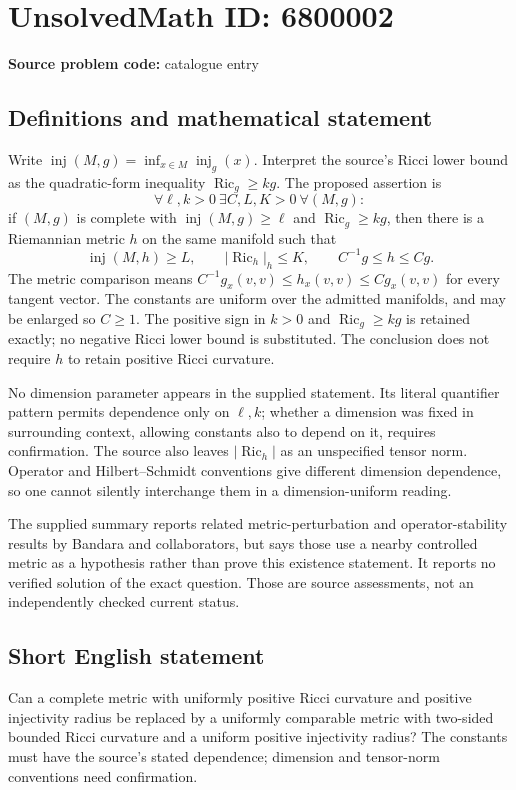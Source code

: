 \documentclass[11pt]{article}
\begin{document}
\section*{UnsolvedMath ID: 6800002}
\textbf{Source problem code:} catalogue entry
\subsection{Definitions and mathematical statement}
Write \(\operatorname{inj}(M,g)=\inf_{x\in M}\operatorname{inj}_g(x)\). Interpret the source's Ricci lower bound as the quadratic-form inequality \(\operatorname{Ric}_g\ge k g\). The proposed assertion is
\[
 \forall\ell,k>0\ \exists C,L,K>0\ \forall(M,g):
\]
if \((M,g)\) is complete with \(\operatorname{inj}(M,g)\ge\ell\) and \(\operatorname{Ric}_g\ge k g\), then there is a Riemannian metric \(h\) on the same manifold such that
\[
 \operatorname{inj}(M,h)\ge L,\qquad |\operatorname{Ric}_h|_h\le K,
 \qquad C^{-1}g\le h\le Cg.
\]
The metric comparison means \(C^{-1}g_x(v,v)\le h_x(v,v)\le Cg_x(v,v)\) for every tangent vector. The constants are uniform over the admitted manifolds, and may be enlarged so \(C\ge1\). The positive sign in \(k>0\) and \(\operatorname{Ric}_g\ge k g\) is retained exactly; no negative Ricci lower bound is substituted. The conclusion does not require \(h\) to retain positive Ricci curvature.

No dimension parameter appears in the supplied statement. Its literal quantifier pattern permits dependence only on \(\ell,k\); whether a dimension was fixed in surrounding context, allowing constants also to depend on it, requires confirmation. The source also leaves \(|\operatorname{Ric}_h|\) as an unspecified tensor norm. Operator and Hilbert--Schmidt conventions give different dimension dependence, so one cannot silently interchange them in a dimension-uniform reading.

The supplied summary reports related metric-perturbation and operator-stability results by Bandara and collaborators, but says those use a nearby controlled metric as a hypothesis rather than prove this existence statement. It reports no verified solution of the exact question. Those are source assessments, not an independently checked current status.
\subsection{Short English statement}
Can a complete metric with uniformly positive Ricci curvature and positive injectivity radius be replaced by a uniformly comparable metric with two-sided bounded Ricci curvature and a uniform positive injectivity radius? The constants must have the source's stated dependence; dimension and tensor-norm conventions need confirmation.
\end{document}
